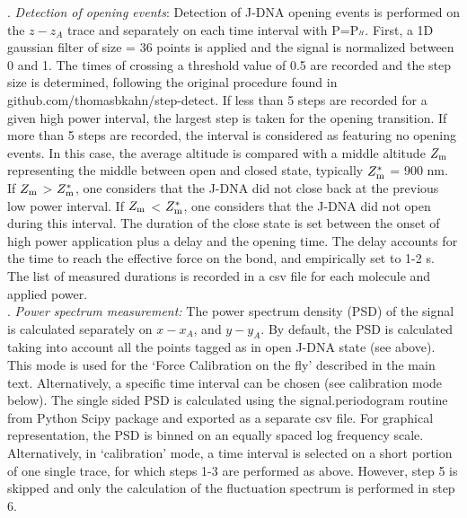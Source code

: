\documentclass{biophys-new}
\begin{document}



. \textit{ Detection of opening events}: Detection of J-DNA opening events is performed on the $ z - z_A$ trace and separately on each time interval with P=P$_{^H}$. First, a 1D gaussian filter of size = 36 points is applied and the signal is normalized between 0 and 1. %
The times of crossing a threshold value of 0.5 are recorded and the step size is determined, following the original procedure found in github.com/thomasbkahn/step-detect. If less than 5 steps are recorded for a given high power interval, the largest step is taken for the opening transition. If more than 5 steps are recorded, the interval is considered as featuring no opening events. In this case, the average altitude is compared with a middle altitude $Z_{\rm m}$ representing the middle between open and closed state, typically $Z^*_{\rm m}$  = 900 nm. If $Z_{\rm m}$ > $Z^*_{\rm m}$, one considers that the J-DNA did not close back at the previous low power interval. If $Z_{\rm m}$ < $Z^*_{\rm m}$, one considers that the J-DNA did not open during this interval. %
The duration of the close state is set between the onset of high power application plus a delay and the opening time. The delay accounts for the time to reach the effective force on the bond, and empirically set to 1-2 s. The list of measured durations is recorded in a csv file for each molecule and applied power.\\

. \textit{ Power spectrum measurement:}
The power spectrum density (PSD) of the signal is calculated separately on $x - x_A$, and $y - y_A$. By default, the PSD is calculated taking into account all the points tagged as in open J-DNA state (see above). This mode is used for the ‘Force Calibration on the fly’ described in the main text. Alternatively, a specific time interval can be chosen (see calibration mode below). The single sided PSD is calculated using the signal.periodogram routine from Python Scipy package and exported as a separate csv file. For graphical representation, the PSD is binned on an equally spaced log frequency scale. %
Alternatively, in ‘calibration’ mode, a time interval is selected on a short portion of one single trace, for which steps 1-3 are performed as above. However, step 5 is skipped and only the calculation of the fluctuation spectrum is performed in step 6.\\
\end{document}
